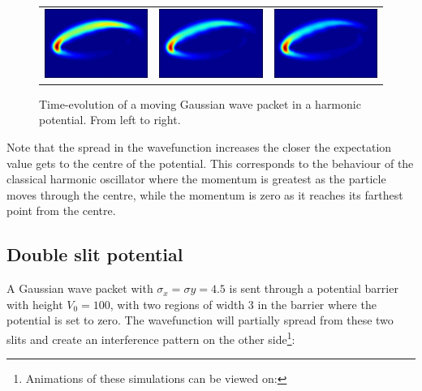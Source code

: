 \begin{figure}[H]
\begin{tabular}{ccc}
  \includegraphics[scale = 0.29]{QHO13.png} &   \includegraphics[scale = 0.29]{QHO14.png}   &   \includegraphics[scale = 0.29]{QHO15.png} \\
\end{tabular}
\caption{Time-evolution of a moving Gaussian wave packet in a harmonic potential. From left to right.}
\end{figure} Note that the spread in the wavefunction increases the closer the expectation value gets to the centre of the potential. This corresponds to the behaviour of the classical harmonic oscillator where the momentum is greatest as the particle moves through the centre, while the momentum is zero as it reaches its farthest point from the centre.

\subsection*{Double slit potential}
A Gaussian wave packet with $\sigma_x = \sigma y = 4.5$ is sent through a potential barrier with height $V_0 = 100$, with two regions of width 3 in the barrier where the potential is set to zero. The wavefunction will partially spread from these two slits and create an interference pattern on the other side\footnote{Animations of these simulations can be viewed on:}:


